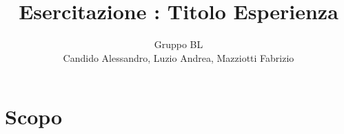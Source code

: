 \documentclass[a4paper,10pt]{article}
\title{Esercitazione \code{\#}: Titolo Esperienza}
\author{Gruppo BL \\ Candido Alessandro, Luzio Andrea, Mazziotti Fabrizio}
\begin{document}
\maketitle

\section{Scopo}
\end{document}
